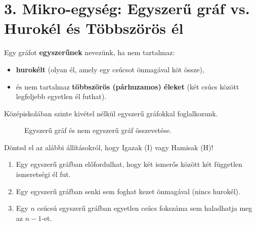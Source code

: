 \documentclass[a4paper,12pt]{article}
\begin{document}
\vspace{0.4cm}
\section{3. Mikro-egység: Egyszerű gráf vs. Hurokél és Többszörös él}

\begin{definiciodoboz}
Egy gráfot \textbf{egyszerűnek} nevezünk, ha nem tartalmaz:
\begin{itemize}
    \item \textbf{hurokélt} (olyan él, amely egy csúcsot önmagával köt össze),
    \item és nem tartalmaz \textbf{többszörös (párhuzamos) éleket} (két csúcs között legfeljebb egyetlen él futhat).
\end{itemize}
\end{definiciodoboz}

Középiskolában szinte kivétel nélkül egyszerű gráfokkal foglalkozunk.

\begin{figure}[H]
    \centering
    \caption{Egyszerű gráf és nem egyszerű gráf összevetése.}
\end{figure}

\begin{feladatdoboz}
Döntsd el az alábbi állításokról, hogy Igazak (I) vagy Hamisak (H)!
\begin{enumerate}[label=\alph*)]
    \item Egy egyszerű gráfban előfordulhat, hogy két ismerős között két független ismeretségi él fut.
    \item Egy egyszerű gráfban senki sem foghat kezet önmagával (nincs hurokél).
    \item Egy $n$ csúcsú egyszerű gráfban egyetlen csúcs fokszáma sem haladhatja meg az $n-1$-et.
\end{enumerate}
\end{feladatdoboz}
\end{document}
